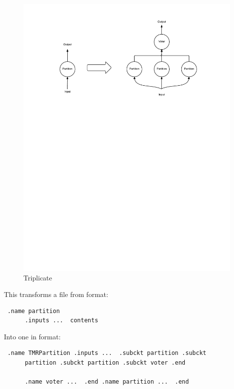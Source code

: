 \documentclass[12pt,final,oneside]{dwThesis} %
\begin{document}
   \begin{figure} \begin{center}
         \includegraphics[width=\linewidth]{images/Triplicate.pdf}
         \caption{Triplicate} \label{imTriplicate} \end{center} \end{figure}
   This transforms a file from format: \begin{lstlisting} .name partition
      .inputs ...  contents \end{lstlisting} Into one in format:
   \begin{lstlisting} .name TMRPartition .inputs ...  .subckt partition .subckt
      partition .subckt partition .subckt voter .end

      .name voter ...  .end .name partition ...  .end \end{lstlisting}
\end{document}
